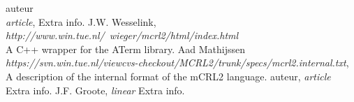 \documentclass[a4paper,10pt]{article}
\theoremstyle{plain}
\theoremstyle{definition}
\begin{document}
\begin{thebibliography}{99}   auteur\\
   \textit{article},
   Extra info.
   J.W. Wesselink,
   \textit{http://www.win.tue.nl/~wieger/mcrl2/html/index.html}\\
   A C++ wrapper for the ATerm library.
 Aad Mathijssen\\
   \textit{https://svn.win.tue.nl/viewcvs-checkout/MCRL2/trunk/specs/mcrl2.internal.txt},
   A description of the internal format of the mCRL2 language.
   auteur,
   \textit{article}
   Extra info.
   J.F. Groote,
   \textit{linear}
   Extra info.

\end{thebibliography}
\end{document}
